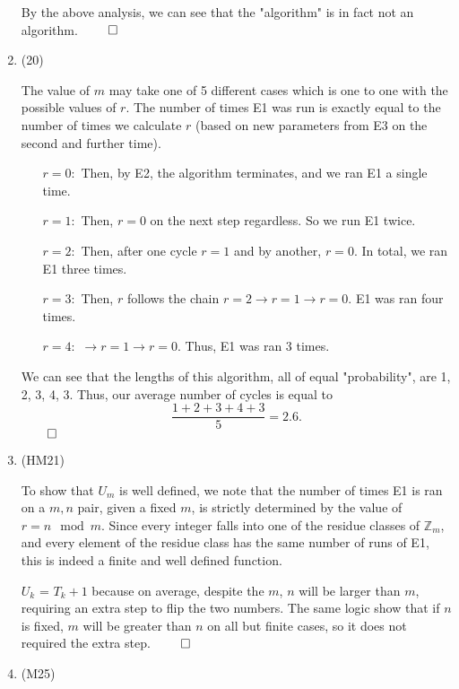 \documentclass[Main.tex]{subfiles}
\begin{document}
\begin{enumerate}
        By the above analysis, we can see that the "algorithm" is in fact not an algorithm. $\hfill\qed$
    
    \item (20)
    
        The value of $m$ may take one of 5 different cases which is one to one with the possible values of $r$. The number of times E1 was run is exactly equal to the number of times we calculate $r$ (based on new parameters from E3 on the second and further time).
        \begin{enumerate}
            \item[$r=0:$] Then, by E2, the algorithm terminates, and we ran E1 a single time.
            \item[$r=1:$] Then, $r=0$ on the next step regardless. So we run E1 twice.
            \item[$r=2:$] Then, after one cycle $r=1$ and by another, $r=0$. In total, we ran E1 three times.
            \item[$r=3:$] Then, $r$ follows the chain $r=2\rightarrow r=1\rightarrow r=0$. E1 was ran four times.
            \item[$r=4:$] $\rightarrow r=1\rightarrow r=0$. Thus, E1 was ran 3 times.
        \end{enumerate}
        
        We can see that the lengths of this algorithm, all of equal "probability", are 1, 2, 3, 4, 3. Thus, our average number of cycles is equal to $$\frac{1 + 2 + 3 + 4 + 3}{5} = 2.6.$$
        $\hfill\qed$
    
    \item (HM21)
    
        To show that $U_m$ is well defined, we note that the number of times E1 is ran on a $m, n$ pair, given a fixed $m$, is strictly determined by the value of $r = n \mod{m}$. Since every integer falls into one of the residue classes of $\mathbb{Z}_m$, and every element of the residue class has the same number of runs of E1, this is indeed a finite and well defined function.
        
        $U_k$ = $T_k + 1$ because on average, despite the $m$, $n$ will be larger than $m$, requiring an extra step to flip the two numbers. The same logic show that if $n$ is fixed, $m$ will be greater than $n$ on all but finite cases, so it does not required the extra step. $\hfill\qed$
    
    \item (M25)
    

\end{enumerate}
\end{document}
